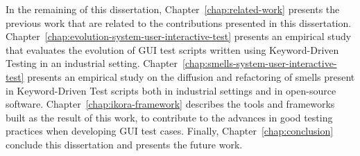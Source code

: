 In the remaining of this dissertation, Chapter~\ref{chap:related-work} presents the previous work that are related to the contributions presented in this dissertation. Chapter~\ref{chap:evolution-system-user-interactive-test} presents an empirical study that evaluates the evolution of GUI test scripts written using Keyword-Driven Testing in an industrial setting. Chapter~\ref{chap:smells-system-user-interactive-test} presents an empirical study on the diffusion and refactoring of smells present in Keyword-Driven Test scripts both in industrial settings and in open-source software. Chapter~\ref{chap:ikora-framework} describes the tools and frameworks built as the result of this work, to contribute to the advances in good testing practices when developing GUI test cases. Finally, Chapter~\ref{chap:conclusion} conclude this dissertation and presents the future work.